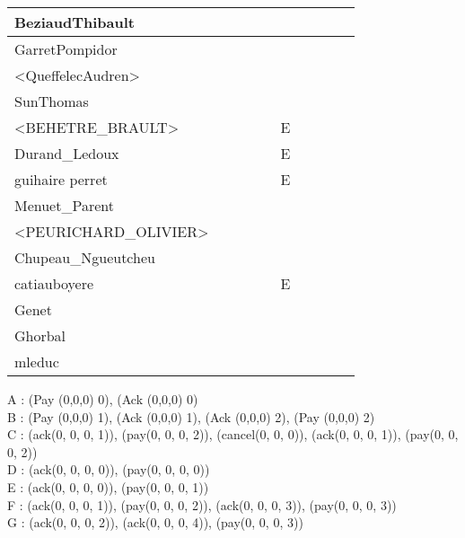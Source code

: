 \documentclass[a4paper]{article}
\begin{document}
\begin{table}[h!]
\begin{tabular}{|l|c|c|c|c|c|c|c|c|c|}
    BeziaudThibault         &       &       &       &       &       &       &       &       &       \\ \hline
    GarretPompidor          &       &       &       &       &       &       &       &       &       \\ \hline
    <QueffelecAudren>       &       &       &       &       &       &       &       &       &       \\ \hline
    SunThomas               &       &       &       &       &       &       &       &       &       \\ \hline
    <BEHETRE\_BRAULT>       &       &       &       &       & E     &       &       &       &       \\ \hline
    Durand\_Ledoux          &       &       &       &       & E     &       &       &       &       \\ \hline
    guihaire perret         &       &       &       &       & E     &       &       &       &       \\ \hline
    Menuet\_Parent          &       &       &       &       &       &       &       &       &       \\ \hline
    <PEURICHARD\_OLIVIER>   &       &       &       &       &       &       &       &       &       \\ \hline
    Chupeau\_Ngueutcheu     &       &       &       &       &       &       &       &       &       \\ \hline
    catiauboyere            &       &       &       &       & E     &       &       &       &       \\ \hline
    Genet                   &       &       &       &       &       &       &       &       &       \\ \hline
    Ghorbal                 &       &       &       &       &       &       &       &       &       \\ \hline
    mleduc                  &       &       &       &       &       &       &       &       &       \\ \hline
\end{tabular}
\end{table}


\newpage
\noindent
A :  (Pay (0,0,0) 0), (Ack (0,0,0) 0) \\
B :  (Pay (0,0,0) 1), (Ack (0,0,0) 1), (Ack (0,0,0) 2), (Pay (0,0,0) 2)\\
C :  (ack(0, 0, 0, 1)), (pay(0, 0, 0, 2)), (cancel(0, 0, 0)), (ack(0, 0, 0, 1)), (pay(0, 0, 0, 2))\\
D :  (ack(0, 0, 0, 0)), (pay(0, 0, 0, 0))\\
E :  (ack(0, 0, 0, 0)), (pay(0, 0, 0, 1))\\
F :  (ack(0, 0, 0, 1)), (pay(0, 0, 0, 2)), (ack(0, 0, 0, 3)), (pay(0, 0, 0, 3))\\
G :  (ack(0, 0, 0, 2)), (ack(0, 0, 0, 4)), (pay(0, 0, 0, 3))
\end{document}
